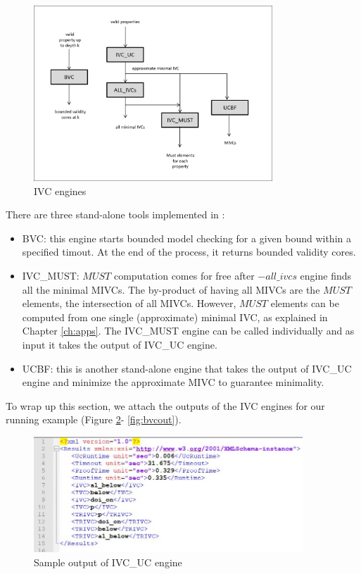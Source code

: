 \begin{figure}
  \centering
  \includegraphics[width=0.8\textwidth]{ivceng.png}
  \caption{\jkind IVC engines}
  \label{fig:ivcengines}
\end{figure}

\noindent There are three stand-alone tools implemented in \jkind:
\begin{itemize}
  \item BVC: this engine starts bounded model checking for a given bound within a specified timout. At the end of the process, it returns bounded validity cores.
  \item IVC\_MUST: $MUST$ computation comes for free after  $-all\_ivcs$ engine finds all the minimal MIVCs. The by-product of having all MIVCs are the $MUST$ elements, the intersection of all MIVCs. However, $MUST$ elements can be computed from one single (approximate) minimal IVC, as explained in Chapter \ref{ch:apps}. The IVC\_MUST engine can be called individually and as input it takes the output of IVC\_UC engine.
  \item UCBF: this is another stand-alone engine that takes the output of IVC\_UC engine and minimize the approximate MIVC to guarantee minimality.
\end{itemize}

To wrap up this section, we attach the outputs of the IVC engines for our running example (Figure \ref{fig:ucout}- \ref{fig:bvcout}).


\begin{figure}
  \centering
  \includegraphics[width=0.9\textwidth]{figs/ucout.jpg}
  \caption{Sample output of IVC\_UC engine}
  \label{fig:ucout}
\end{figure}

